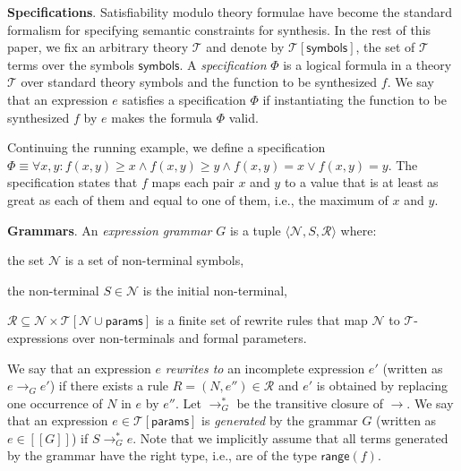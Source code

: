 \documentclass{llncs}
\newcommand\tuple[1]{\langle #1 \rangle}
\newcommand\Expr{e}
\newcommand\Spec{\Phi}
\newcommand\Grammar{G}
\newcommand\sem[1]{[\![ #1 ]\!]}
\newcommand\SynthFun{f}
\newcommand\range{\mathsf{range}}
\newcommand\FormalParameters{\mathsf{params}}
\newcommand\NonTerminals{\mathcal{N}}
\newcommand\NonTerminal{N}
\newcommand\StartSymbol{S}
\newcommand\Symbols{\mathsf{symbols}}
\newcommand\Rules{\mathcal{R}}
\newcommand\Rule{R}
\newcommand\Theory{\mathcal{T}}
\newcommand\RewritesTo{\rightarrow}
\renewcommand{\paragraph}[1]{\par\noindent\textbf{#1}.}
\begin{document}
\paragraph{Specifications}
Satisfiability modulo theory formulae have become the standard formalism
for specifying semantic constraints for synthesis.
In the rest of this paper, we fix an arbitrary theory $\Theory$ and
denote by $\Theory[\Symbols]$, the set of $\Theory$ terms over the
symbols $\Symbols$.
A {\em specification} $\Spec$ is a logical formula in a theory $\Theory$
over standard theory symbols and the function to be synthesized
$\SynthFun$.
We say that an expression $\Expr$ satisfies a specification $\Spec$ if
instantiating the function to be synthesized $\SynthFun$ by $\Expr$
makes the formula $\Spec$ valid.

\begin{example}
  \label{ex:running:spec}
  Continuing the running example, we define a specification $\Spec
  \equiv \forall x, y : \SynthFun(x, y) \geq x \wedge \SynthFun(x, y)
  \geq y \wedge f(x, y) = x \vee f(x, y) = y$.
  The specification states that $\SynthFun$ maps each pair $x$ and $y$
  to a value that is at least as great as each of them and equal to one
  of them, i.e., the maximum of $x$ and $y$.
\end{example}

\paragraph{Grammars}
An {\em expression grammar} $\Grammar$ is a tuple $\tuple {
\NonTerminals, \StartSymbol, \Rules }$ where:
\begin{inparaenum}[(a)]
\item the set $\NonTerminals$ is a set of non-terminal symbols,
\item the non-terminal $\StartSymbol \in \NonTerminals$ is the initial non-terminal,
\item $\Rules \subseteq \NonTerminals \times
  \Theory[\NonTerminals \cup \FormalParameters]$ is a finite set
  of rewrite rules that map $\NonTerminals$ to $\Theory$-expressions
  over non-terminals and formal parameters.
\end{inparaenum}
We say that an expression $\Expr$ {\em rewrites to} an incomplete
expression $\Expr'$ (written as $\Expr \RewritesTo_\Grammar \Expr'$) if
there exists a rule $\Rule = (\NonTerminal, \Expr'') \in \Rules$ and
$\Expr'$ is obtained by replacing one occurrence of $\NonTerminal$ in
$\Expr$ by $\Expr''$.
Let $\RewritesTo_\Grammar^*$ be the transitive closure of $\RewritesTo$.
We say that an expression $\Expr \in \Theory[\FormalParameters]$
is {\em generated} by the grammar $\Grammar$ (written as $\Expr \in
\sem{\Grammar}$) if $\StartSymbol \RewritesTo_\Grammar^* \Expr$.
Note that we implicitly assume that all terms generated by the grammar
have the right type, i.e., are of the type $\range(\SynthFun)$.
\end{document}
